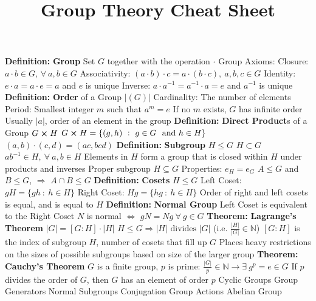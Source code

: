 \documentclass[14pt]{extarticle}
\title{Group Theory Cheat Sheet}
\def\Definition{{\color{blue} \textbf{Definition:} }}
\def\Theorem{{\color{red} \textbf{Theorem:} }}
\begin{document}
	\maketitle
	\begin{outline}		
		\1	\Definition \textbf{Group}
			\2	Set $G$ together with the operation $\cdot$
			\2	Group Axioms:
				\3	Closure:	$a \cdot b \in G$, $\forall~a,b \in G$
				\3	Associativity:	$(a \cdot b) \cdot c = a \cdot (b \cdot c),~a,b,c \in G$
				\3	Identity:	$e \cdot a = a \cdot e = a$ and $e$ is unique
				\3	Inverse: $a \cdot a^{-1} = a^{-1} \cdot a = e$ and $a^{-1}$ is unique
		\1	\Definition \textbf{Order} of a Group $|(G)|$
			\2	Cardinality:	The number of elements
			\2	Period:	Smallest integer $m$ such that $a^m = e$
				\3	If no $m$ exists, $G$ has infinite order
				\3	Usually $|a|$, order of an element in the group
		\1	\Definition \textbf{Direct Product}s of a Group $G \cross H$
			\2	$G \cross H = \{(g,h)~:~g \in G~\text{ and } h \in H\}$
			\2	$(a,b) \cdot (c,d) = (ac,bcd)$
		\1	\Definition \textbf{Subgroup} $H \le G$
			\2	$H \subset G$
			\2	$ab^{-1} \in H,~\forall~a,b \in H$
			\2	Elements in $H$ form a group that is closed within $H$ under products and inverses
			\2	Proper subgroup $H \subseteq G$
			\2	Properties:
				\3	$e_H = e_G$
				\3	$A \le G$ and $B \le G$, $\Rightarrow$ $A \cap B \le G$
		\1	\Definition \textbf{Cosets}
			\2	$H \le G$
			\2	Left Coset:	 $gH = \{gh~:~h \in H\}$
			\2	Right Coset: $Hg = \{hg~:~h \in H\}$	
			\2	Order of right and left cosets is equal, and is equal to $H$
		\1	\Definition \textbf{Normal Group}
			\2	Left Coset is equivalent to the Right Coset
			\2	$N$ is normal $\Leftrightarrow$ $gN = Ng~\forall~g \in G$
		\1	\Theorem \textbf{Lagrange's Theorem}
			\2	$|G| = [G:H] \cdot |H|$
			\2	$H \le G \Rightarrow |H| \text{ divides } |G|$ (i.e. $\frac{|H|}{|G|} \in \mathbb{N}$)
			\2	$[G : H]$ is the index of subgroup $H$, number of cosets that fill
					up $G$
			\2	Places heavy restrictions on the sizes of possible subgroups based
					on size of the larger group
		\1	\Theorem \textbf{Cauchy's Theorem}
			\2	$G$ is a finite group, $p$ is prime: $\frac{|G|}{p} \in \mathbb{N} \rightarrow \exists~g^p = e \in G$
			\2	If $p$ divides the order of $G$, then $G$ has an element of order $p$
		\1	Cyclic Groups
		\1	Group Generators
		\1	Normal Subgroups
		\1	Conjugation
		\1	Group Actions
		\1	Abelian Group
	\end{outline}
\end{document}
